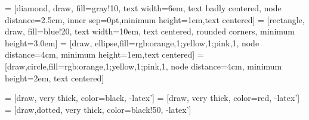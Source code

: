 
\usepackage{amsmath,amssymb,latexsym,float,epsfig,hyperref}
\usepackage{framed,color,url,fancybox,fullpage,booktabs,subfigure,wrapfig,chngpage,setspace}
\usepackage[latin1]{inputenc}
\usepackage{tikz}

\usetikzlibrary{shapes,arrows}
\usetikzlibrary{arrows,positioning,mindmap} 
\usetikzlibrary{calc,trees,positioning,arrows,chains,shapes.geometric,%
decorations.pathreplacing,decorations.pathmorphing,shapes,%
matrix,shapes.symbols,plotmarks,decorations.markings,shadows}
\usetikzlibrary{patterns}

 = [diamond, draw, fill=gray!10,
  text width=6em, text badly centered, node distance=2.5cm, 
  inner sep=0pt,minimum height=1em,text centered]
 = [rectangle, draw, fill=blue!20,
  text width=10em, text centered, rounded corners, minimum height=3.0em]
 = [draw, ellipse,fill={rgb:orange,1;yellow,1;pink,1}, node distance=4cm,
    minimum height=1em,text centered]
 = [draw,circle,fill={rgb:orange,1;yellow,1;pink,1}, 
  node distance=4cm, minimum height=2em, text centered]

 = [draw, very thick, color=black, -latex']
 = [draw, very thick, color=red, -latex']
 = [draw,dotted, very thick, color=black!50, -latex']
